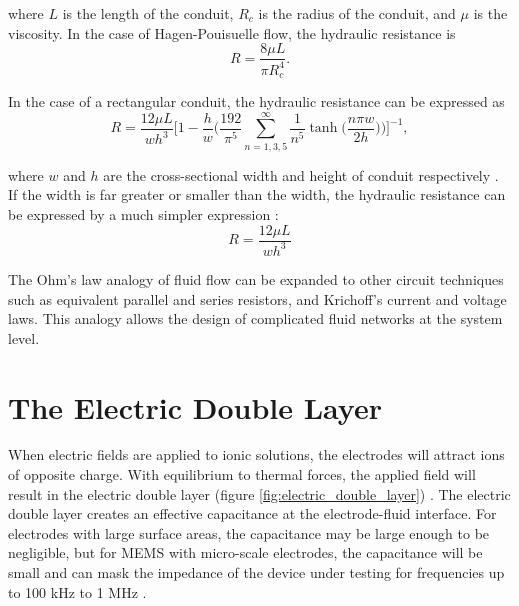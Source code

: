 \noindent where $L$ is the length of the conduit, $R_c$ is the radius of the conduit, and $\mu$ is the viscosity. In the case of Hagen-Pouisuelle flow, the hydraulic resistance is 
\begin{equation}
    R = \frac{8\mu L}{\pi R_c^4}.
\end{equation}

\par In the case of a rectangular conduit, the hydraulic resistance can be expressed as
\begin{equation}
    R = \frac{12\mu L}{wh^3}\Bigg[1 - \frac{h}{w}\bigg( \frac{192}{\pi^5} \sum_{n=1,3,5}^\infty \frac{1}{n^5} \tanh\Big(\frac{n\pi w}{2h}\Big) \bigg) \Bigg]^{-1},
\end{equation}

\noindent where $w$ and $h$ are the cross-sectional width and height of conduit respectively \cite{david_j._beebe_physics_2002}. If the width is far greater or smaller than the width, the hydraulic resistance can be expressed by a much simpler expression \cite{david_j._beebe_physics_2002}:
\begin{equation}
    R = \frac{12 \mu L}{wh^3} 
\end{equation}

\par The Ohm's law analogy of fluid flow can be expanded to other circuit techniques such as equivalent parallel and series resistors, and Krichoff's current and voltage laws. This analogy allows the design of complicated fluid networks at the system level.

\section{The Electric Double Layer}
\label{sec:the_electric_double_layer}

\par When electric fields are applied to ionic solutions, the electrodes will attract ions of opposite charge. With equilibrium to thermal forces, the applied field will result in the electric double layer (figure \ref{fig:electric_double_layer}) \cite{ishai_electrode_2013}. The electric double layer creates an effective capacitance at the electrode-fluid interface. For electrodes with large surface areas, the capacitance may be large enough to be negligible, but for MEMS with micro-scale electrodes, the capacitance will be small and can mask the impedance of the device under testing for frequencies up to 100 kHz to 1 MHz \cite{bordi_reduction_2001}. 

